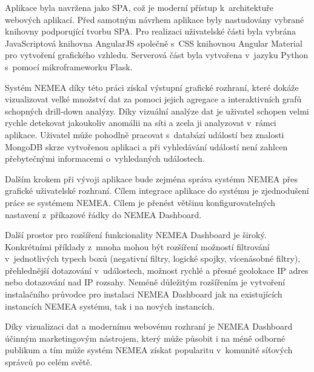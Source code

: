 Aplikace byla navržena jako SPA, což je moderní přístup k~architektuře webových aplikací. Před samotným návrhem aplikace byly nastudovány vybrané knihovny podporující tvorbu SPA. Pro realizaci uživatelské části byla vybrána JavaScriptová knihovna AngularJS společně s~CSS knihovnou Angular Material pro vytvoření grafického vzhledu. Serverová část byla vytvořena v~jazyku Python s~pomocí mikroframeworku Flask.

Systém NEMEA díky této práci získal výstupní grafické rozhraní, které dokáže vizualizovat velké množství dat za pomoci jejich agregace a interaktivních grafů schopných drill-down analýzy. Díky vizuální analýze dat je uživatel schopen velmi rychle detekovat jakoukoliv anomálii na síti a zcela ji analyzovat v~rámci aplikace. Uživatel může pohodlně pracovat s~databází událostí bez znalosti MongoDB skrze vytvořenou aplikaci a při vyhledávání událostí není zahlcen přebytečnými informacemi o~vyhledaných událostech.

Dalším krokem při vývoji aplikace bude zejména správa systému NEMEA přes grafické uživatelské rozhraní. Cílem integrace aplikace do systému je zjednodušení práce se systémem NEMEA. Cílem je přenést většinu konfigurovatelných nastavení z~příkazové řádky do NEMEA Dashboard.

Další prostor pro rozšíření funkcionality NEMEA Dashboard je široký. Konkrétními příklady z~mnoha mohou být rozšíření možností filtrování v~jednotlivých typech boxů (negativní filtry, logické spojky, vícenásobné filtry), přehlednější dotazování v~událostech, možnost rychlé a přesné geolokace IP adres nebo dotazování nad IP rozsahy. Neméně důležitým rozšířením je vytvoření instalačního průvodce pro instalaci NEMEA Dashboard jak na existujících instancích NEMEA systému, tak i na nových instancích.

Díky vizualizaci dat a modernímu webovému rozhraní je NEMEA Dashboard účinným marketingovým nástrojem, který může působit i na méně odborné publikum a tím může systém NEMEA získat popularitu v~komunitě síťových správců po celém světě.
